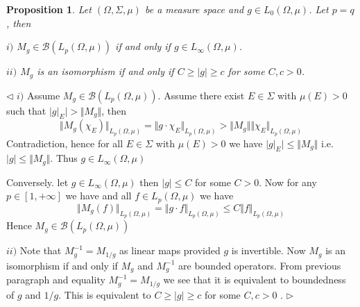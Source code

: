 \documentclass[12pt]{article}
\newtheorem{proposition}[theorem]{Proposition}
\newenvironment{proof}{\par $\triangleleft$}{$\triangleright$}
\begin{document}
\begin{proposition}\label{MulpOpPropIfPeqqualsQ} Let $(\Omega,\Sigma,\mu)$ be a measure space and $g\in L_0(\Omega,\mu)$. Let $p=q$, then

$i)$ $M_g\in\mathcal{B}(L_p(\Omega,\mu))$ if and only if $g\in L_\infty(\Omega,\mu)$.

$ii)$ $M_g$ is an isomorphism if and only if $C\geq |g|\geq c$ for some $C,c>0$.
\end{proposition}
\begin{proof}
$i)$ Assume $M_g\in\mathcal{B}(L_p(\Omega,\mu))$. Assume there exist $E\in\Sigma$ with $\mu(E)>0$ such that $|g|_E|>\Vert M_g\Vert$, then
$$
\Vert M_g(\chi_E)\Vert_{L_p(\Omega,\mu)}
=\Vert g\cdot\chi_E\Vert_{L_p(\Omega,\mu)}
>\Vert M_g\Vert\Vert\chi_E\Vert_{L_p(\Omega,\mu)}
$$
Contradiction, hence for all $E\in\Sigma$ with $\mu(E)>0$ we have $|g|_E|\leq \Vert M_g\Vert$ i.e.  $|g|\leq \Vert M_g\Vert$. Thus $g\in L_\infty(\Omega,\mu)$

Conversely. let $g\in L_\infty(\Omega,\mu)$ then $|g|\leq C$ for some $C>0$. Now for any $p\in[1,+\infty]$ we have and all $f\in L_p(\Omega,\mu)$ we have
$$
\Vert M_g(f)\Vert_{L_p(\Omega,\mu)}
=\Vert g\cdot f\Vert_{L_p(\Omega,\mu)}
\leq C\Vert f\Vert_{L_p(\Omega,\mu)}
$$
Hence $M_g\in\mathcal{B}(L_p(\Omega,\mu))$

$ii)$ Note that $M_g^{-1}=M_{1/g}$ as linear maps provided $g$ is invertible. Now $M_g$ is an isomorphism if and only if $M_g$ and $M_g^{-1}$ are bounded operators. From previous paragraph and equality $M_g^{-1}=M_{1/g}$ we see that it is equivalent to boundedness of $g$ and $1/g$. This is equivalent to $C\geq|g|\geq c$ for some $C,c>0$
.
\end{proof}
\end{document}
